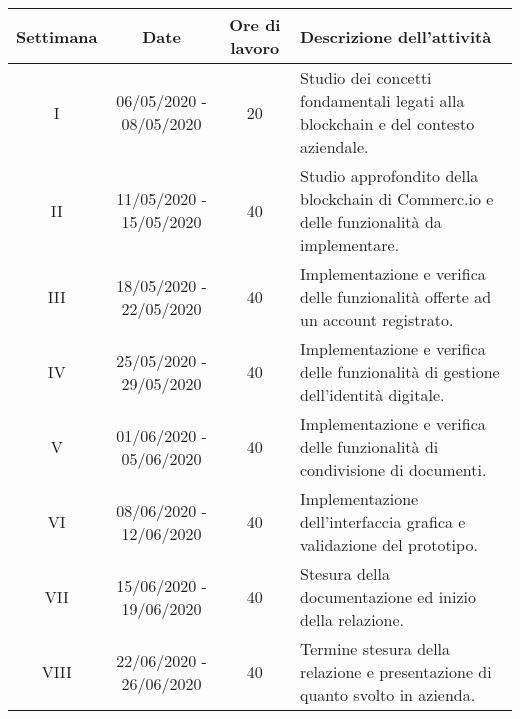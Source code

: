 
\begin{tabularx}{\textwidth}{|c|c|c|p{7.85cm}|}
	\hline
	\textbf{Settimana} & \textbf{Date} & \textbf{Ore di lavoro} & \textbf{Descrizione dell'attività} \\\hline
	I & 06/05/2020 - 08/05/2020 & 20 & Studio dei concetti fondamentali legati alla blockchain e del contesto aziendale. \\\hline
	II & 11/05/2020 - 15/05/2020 & 40 & Studio approfondito della blockchain di Commerc.io e delle funzionalità da implementare. \\\hline
	III & 18/05/2020 - 22/05/2020 & 40 & Implementazione e verifica delle funzionalità offerte ad un account registrato. \\\hline
	IV & 25/05/2020 - 29/05/2020 & 40 & Implementazione e verifica delle funzionalità di gestione dell'identità digitale. \\\hline
	V & 01/06/2020 - 05/06/2020 & 40 & Implementazione e verifica delle funzionalità di condivisione di documenti. \\\hline
	VI & 08/06/2020 - 12/06/2020 & 40 & Implementazione dell'interfaccia grafica e validazione del prototipo. \\\hline
	VII & 15/06/2020 - 19/06/2020 & 40 & Stesura della documentazione ed inizio della relazione. \\\hline
	VIII & 22/06/2020 - 26/06/2020 & 40 & Termine stesura della relazione e presentazione di quanto svolto in azienda. \\\hline
\end{tabularx}
